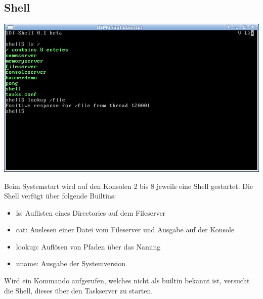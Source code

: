 \subsection{Shell}

\begin{center}
\includegraphics[scale=0.65]{shell}
\end{center}

Beim Systemstart wird auf den Konsolen 2 bis 8 jeweils eine Shell gestartet. Die Shell verfügt über folgende Builtins:

\begin{itemize}
	\item ls: Auflisten eines Directories auf dem Fileserver
	\item cat: Auslesen einer Datei vom Fileserver und Ausgabe auf der Konsole
	\item lookup: Auflösen von Pfaden über das Naming
	\item uname: Ausgabe der Systemversion
\end{itemize}

Wird ein Kommando aufgerufen, welches nicht als builtin bekannt ist, versucht die Shell, dieses über den Taskserver zu starten.
